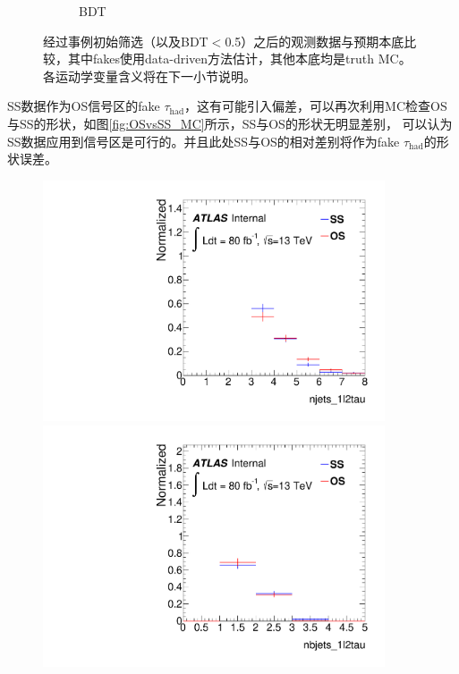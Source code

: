 \begin{figure}[h]
\begin{subfigure}[b]{0.45\textwidth}
 \caption{BDT}
\end{subfigure}
\caption{经过\ltwotau 事例初始筛选（以及BDT$<$0.5）之后的观测数据与预期本底比较，其中fakes使用data-driven方法估计，其他本底均是truth MC。各运动学变量含义将在下一小节说明。}
\label{fig:dataBkg_1l2tau_fakes}
\end{figure}
\clearpage
SS数据作为OS信号区的fake $\tau_{\text{had}}$，这有可能引入偏差，可以再次利用MC检查OS与SS的形状，如图\ref{fig:OSvsSS_MC}所示，SS与OS的形状无明显差别，
可以认为SS数据应用到信号区是可行的。并且此处SS与OS的相对差别将作为fake $\tau_{\text{had}}$的形状误差。
\begin{figure}[htp]
\begin{minipage}[t]{0.33\linewidth}
\centering
\includegraphics[width=0.9\textwidth,angle=-90]{fig/OSvsSS_all/njets_1l2tau_F.pdf}
\end{minipage}
\begin{minipage}[t]{0.33\linewidth}
\centering
\includegraphics[width=0.9\textwidth,angle=-90]{fig/OSvsSS_all/nbjets_1l2tau_F.pdf}

\end{minipage}
\end{figure}
